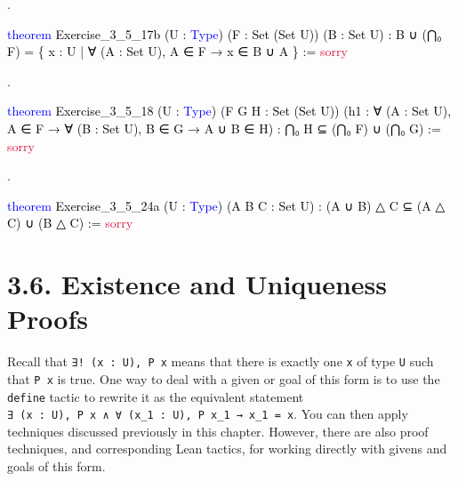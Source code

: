 \documentclass[
  letterpaper,
  DIV=11,
  numbers=noendperiod]{scrreprt}
\newenvironment{Shaded}{\begin{snugshade}}{\end{snugshade}}
\newcommand{\ConstantTok}[1]{\textcolor[rgb]{0.56,0.35,0.01}{#1}}
\newcommand{\KeywordTok}[1]{\textcolor[rgb]{0.00,0.23,0.31}{#1}}
\newcommand{\NormalTok}[1]{\textcolor[rgb]{0.00,0.23,0.31}{#1}}
\renewcommand{\NormalTok}[1]{\textcolor[HTML]{000000}{#1}}
\renewcommand{\KeywordTok}[1]{\textcolor[HTML]{0000FF}{#1}}
\renewcommand{\ConstantTok}[1]{\textcolor[HTML]{DC143C}{#1}}
\newcommand{\nobreakShaded}{\renewenvironment{Shaded}
	{\begin{tcolorbox}[frame hidden, enhanced, interior hidden, boxrule=0pt,
		borderline west={3pt}{0pt}{shadecolor}, sharp corners]}
	{\end{tcolorbox}}}
\newenvironment{numex}[1]
	{\begin{minipage}[t]{0.04\textwidth}\vspace{8pt}{#1}.
		\end{minipage}\nobreakShaded\begin{minipage}[t]{0.96\textwidth}\vspace{0pt}}
	{\end{minipage}}
\theoremstyle{remark}
\begin{document}
\begin{numex}{5}

\begin{Shaded}
\begin{Highlighting}[]
\KeywordTok{theorem}\NormalTok{ Exercise\_3\_5\_17b (U : }\KeywordTok{Type}\NormalTok{) (F : Set (Set U)) (B : Set U) :}
\NormalTok{    B ∪ (⋂₀ F) = \{ x : U | ∀ (A : Set U), A ∈ F → x ∈ B ∪ A \} := }\ConstantTok{sorry}
\end{Highlighting}
\end{Shaded}

\end{numex}

\begin{numex}{6}

\begin{Shaded}
\begin{Highlighting}[]
\KeywordTok{theorem}\NormalTok{ Exercise\_3\_5\_18 (U : }\KeywordTok{Type}\NormalTok{) (F G H : Set (Set U))}
\NormalTok{    (h1 : ∀ (A : Set U), A ∈ F → ∀ (B : Set U), B ∈ G → A ∪ B ∈ H) :}
\NormalTok{    ⋂₀ H ⊆ (⋂₀ F) ∪ (⋂₀ G) := }\ConstantTok{sorry}
\end{Highlighting}
\end{Shaded}

\end{numex}

\begin{numex}{7}

\begin{Shaded}
\begin{Highlighting}[]
\KeywordTok{theorem}\NormalTok{ Exercise\_3\_5\_24a (U : }\KeywordTok{Type}\NormalTok{) (A B C : Set U) :}
\NormalTok{    (A ∪ B) △ C ⊆ (A △ C) ∪ (B △ C) := }\ConstantTok{sorry}
\end{Highlighting}
\end{Shaded}

\end{numex}

\hypertarget{existence-and-uniqueness-proofs}{%
\section{3.6. Existence and Uniqueness
Proofs}\label{existence-and-uniqueness-proofs}}

Recall that \texttt{∃!\ (x\ :\ U),\ P\ x} means that there is exactly
one \texttt{x} of type \texttt{U} such that \texttt{P\ x} is true. One
way to deal with a given or goal of this form is to use the
\texttt{define} tactic to rewrite it as the equivalent statement
\texttt{∃\ (x\ :\ U),\ P\ x\ ∧\ ∀\ (x\_1\ :\ U),\ P\ x\_1\ →\ x\_1\ =\ x}.
You can then apply techniques discussed previously in this chapter.
However, there are also proof techniques, and corresponding Lean
tactics, for working directly with givens and goals of this form.
\end{document}

